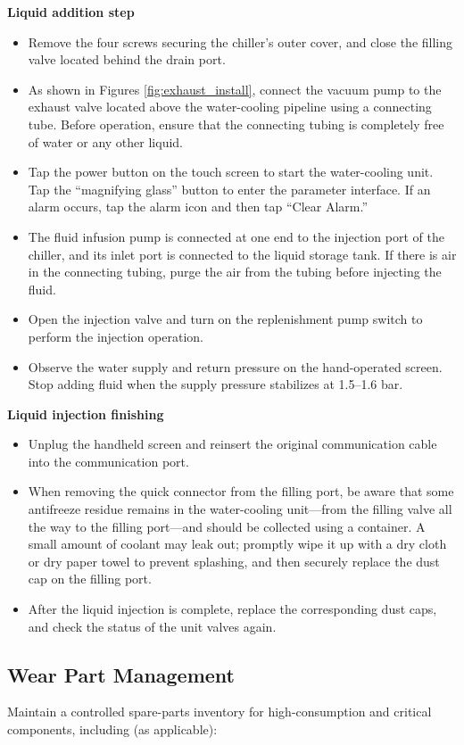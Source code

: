 \documentclass[11pt, a4paper]{article}
\begin{document}
\textbf{Liquid addition step}
\begin{itemize}[leftmargin=1.5em]
    \item Remove the four screws securing the chiller's outer cover, and close the filling valve located behind the drain port.
    \item As shown in Figures \ref{fig:exhaust_install}, connect the vacuum pump to the exhaust valve located above the water-cooling pipeline using a connecting tube. Before operation, ensure that the connecting tubing is completely free of water or any other liquid.
    \item Tap the power button on the touch screen to start the water-cooling unit. Tap the “magnifying glass” button to enter the parameter interface. If an alarm occurs, tap the alarm icon and then tap “Clear Alarm.”
    \item The fluid infusion pump is connected at one end to the injection port of the chiller, and its inlet port is connected to the liquid storage tank. If there is air in the connecting tubing, purge the air from the tubing before injecting the fluid.
    \item Open the injection valve and turn on the replenishment pump switch to perform the injection operation.
    \item Observe the water supply and return pressure on the hand-operated screen. Stop adding fluid when the supply pressure stabilizes at 1.5–1.6 bar.
\end{itemize}

\textbf{Liquid injection finishing}
\begin{itemize}[leftmargin=1.5em]
    \item Unplug the handheld screen and reinsert the original communication cable into the communication port.
    \item When removing the quick connector from the filling port, be aware that some antifreeze residue remains in the water-cooling unit—from the filling valve all the way to the filling port—and should be collected using a container. A small amount of coolant may leak out; promptly wipe it up with a dry cloth or dry paper towel to prevent splashing, and then securely replace the dust cap on the filling port.
    \item After the liquid injection is complete, replace the corresponding dust caps, and check the status of the unit valves again.
\end{itemize}

\subsection{Wear Part Management}
Maintain a controlled spare-parts inventory for high-consumption and critical components, including (as applicable): 
\end{document}
